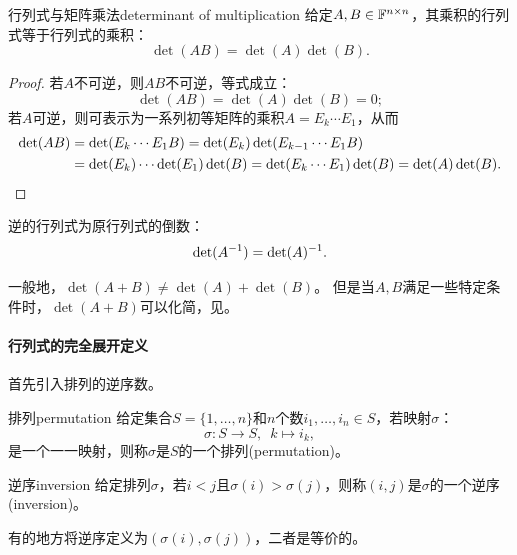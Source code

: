 \begin{theorem}{行列式与矩阵乘法}{determinant of multiplication}
	给定$A,B \in \mathbb{F}^{n\times n}$，其乘积的行列式等于行列式的乘积：
	\begin{equation}
		\det(AB) = \det(A)\det(B).
	\end{equation}
\end{theorem}
\begin{proof}
	若$A$不可逆，则$AB$不可逆，等式成立：
	\[
		\det(AB) = \det(A)\det(B) = 0;
	\]
	若$A$可逆，则可表示为一系列初等矩阵的乘积$A = E_k\cdots E_1$，从而
	\begin{align*}
		\det(AB) &= \det(E_k\cdots E_1B) = \det(E_k)\det(E_{k-1}\cdots E_1B)\\
		&= \det(E_k)\cdots\det(E_1)\det(B) = \det(E_k\cdots E_1)\det(B) = \det(A)\det(B).
		\qedhere
	\end{align*}
\end{proof}
\begin{corollary}
	逆的行列式为原行列式的倒数：
	\begin{align}
		\det(A^{-1}) = \det(A)^{-1}.
	\end{align}
\end{corollary}

\begin{remark}
	一般地，$\det(A + B) \neq \det(A) + \det(B)$。
	但是当$A,B$满足一些特定条件时，$\det(A + B)$可以化简，见。
\end{remark}

\paragraph{行列式的完全展开定义}

首先引入排列的逆序数。

\begin{definition}
	{排列}{permutation}
	给定集合$S = \{1,\ldots,n\}$和$n$个数$i_1,\ldots,i_n \in S$，若映射$\sigma$：
	\[
		\sigma:S \to S,\enspace k \mapsto i_k,
	\]
	是一个一一映射，则称$\sigma$是$S$的一个排列(permutation)。
\end{definition}
\begin{definition}
	{逆序}{inversion}
	给定排列$\sigma$，若$i < j$且$\sigma(i) > \sigma(j)$，则称$(i,j)$是$\sigma$的一个逆序(inversion)。
\end{definition}

\begin{remark}
	有的地方将逆序定义为$(\sigma(i),\sigma(j))$，二者是等价的。
\end{remark}

